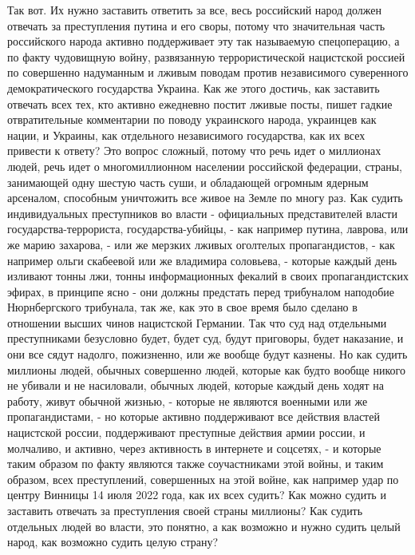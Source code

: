 Так вот. Их нужно заставить ответить за все, весь российский народ должен
отвечать за преступления путина и его своры, потому что значительная часть
российского народа активно поддерживает эту так называемую спецоперацию, а по
факту чудовищную войну, развязанную террористической нацистской россией по
совершенно надуманным и лживым поводам против независимого суверенного
демократического государства Украина. Как же этого достичь, как заставить
отвечать всех тех, кто активно ежедневно постит лживые посты, пишет гадкие
отвратительные комментарии по поводу украинского народа, украинцев как нации, и
Украины, как отдельного независимого государства, как их всех привести к
ответу? Это вопрос сложный, потому что речь идет о миллионах людей, речь идет о
многомиллионном населении российской федерации, страны, занимающей одну шестую
часть суши, и обладающей огромным ядерным арсеналом, способным уничтожить все
живое на Земле по многу раз. Как судить индивидуальных преступников во власти -
официальных представителей власти государства-террориста, государства-убийцы, -
как например путина, лаврова, или же марию захарова, - или же мерзких лживых
оголтелых пропагандистов, - как например ольги скабеевой или же владимира
соловьева, - которые каждый день изливают тонны лжи, тонны информационных
фекалий в своих пропагандистских эфирах, в принципе ясно - они должны предстать
перед трибуналом наподобие Нюрнбергского трибунала, так же, как это в свое
время было сделано в отношении высших чинов нацистской Германии.  Так что суд
над отдельными преступниками безусловно будет, будет суд, будут приговоры,
будет наказание, и они все сядут надолго, пожизненно, или же вообще будут
казнены.  Но как судить миллионы людей, обычных совершенно людей, которые как
будто вообще никого не убивали и не насиловали, обычных людей, которые каждый
день ходят на работу, живут обычной жизнью, - которые не являются военными или
же пропагандистами, - но которые активно поддерживают все действия властей
нацистской россии, поддерживают преступные действия армии россии, и молчаливо,
и активно, через активность в интернете и соцсетях, - и которые таким образом
по факту являются также соучастниками этой войны, и таким образом, всех
преступлений, совершенных на этой войне, как например удар по центру Винницы 14
июля 2022 года, как их всех судить? Как можно судить и заставить отвечать за
преступления своей страны миллионы? Как судить отдельных людей во власти, это
понятно, а как возможно и нужно судить целый народ, как возможно судить целую
страну?

